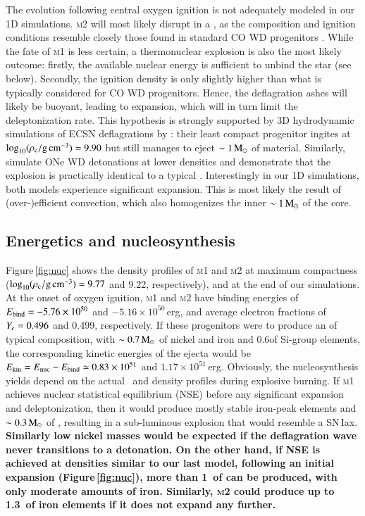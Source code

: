 \documentclass[twocolumn]{aa}
\begin{document}
The evolution following central oxygen ignition is not adequately modeled in our 1D simulations. 
 \textsc{m2} will most likely disrupt in a \ia, as the composition and
 ignition conditions resemble closely those found in standard CO WD \ia
 progenitors \citep{Nomoto:1982zz}. While the fate of \textsc{m1} is less 
 certain, a thermonuclear explosion is also the most likely outcome: 
 firstly, the available nuclear energy is sufficient to unbind the star (see 
 below). Secondly, the ignition density is only slightly higher than  what is typically considered for CO WD \ia progenitors. 
 Hence, the deflagration ashes will likely be buoyant, leading to expansion, which will in turn limit the deleptonization rate. This hypothesis is strongly supported
 by 3D hydrodynamic  simulations of ECSN deflagrations by \cite{Jones:2016asr,Jones:2018ule}: their least compact progenitor ingites at $\log_{10} (\rho_{\mathrm{c}}/ \mathrm{g\,cm^{-3}})=9.90$ but still manages to eject  $\sim 1\mathrm{\,M_\odot}$ of material. 
 Similarly,  \cite{marquardt2015} simulate ONe WD detonations at lower 
 densities and demonstrate that the explosion is practically identical to a 
 typical \ia. 
 Interestingly in our 1D simulations, both models experience significant expansion. This is most likely the result of (over-)efficient convection, which also homogenizes the inner $\sim 1\mathrm{\,M_\odot}$ of the core. 
 
 
 
 

\subsection{Energetics and nucleosynthesis}\label{sec:3}
Figure\,\ref{fig:nuc} shows the density profiles of \textsc{m1} and \textsc{m2} at maximum compactness ($\log_{10} (\rho_{\mathrm{c}}/ \mathrm{g\,cm^{-3}})=9.77$ and 9.22, respectively), and at the end of our simulations. At the onset of oxygen ignition, \textsc{m1} and \textsc{m2} have binding energies of $E_{\rm bind}=-5.76\times10^{50}$ and $-5.16\times10^{50}$\,erg, and average electron fractions of $Y_e= 0.496$ and  0.499, respectively. If these progenitors were to produce an \ia of  typical composition, with $\sim 0.7\mathrm{\,M_\odot}$ of nickel and iron and 0.6\msun of Si-group elements, the corresponding kinetic energies of the ejecta would be $E_{\rm kin}=E_{\rm nuc}-E_{\rm bind}\simeq 0.83\times10^{51}$ and  $1.17\times10^{51}$\,erg. 
Obviously, the nucleosynthesis yields depend on the actual
\ye\ and density profiles during explosive burning. If 
\textsc{m1} achieves nuclear statistical equilibrium (NSE)
before any significant expansion and deleptonization, then it
would produce mostly stable iron-peak elements and $\sim 0.3\mathrm{\,M_\odot}$ of , resulting in a sub-luminous 
explosion that would resemble a SN\,Iax. {\bf Similarly low nickel masses would be expected if the deflagration wave never transitions to a detonation. On the other hand, if NSE is achieved at densities similar to our last \mesa model, following an 
initial expansion (Figure\,\ref{fig:nuc}), more than 
1\msun\ of  can be produced, with only moderate
amounts of iron. Similarly, \textsc{m2} could produce up 
to 1.3\msun\ of iron elements if it does not expand any further. }
\end{document}

